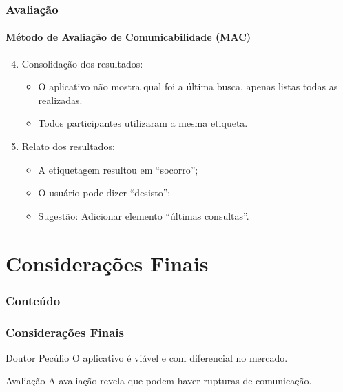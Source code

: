 \documentclass[14pt,beamer]{beamer}
\begin{document}
\begin{frame}
	\frametitle{Avaliação}
	\framesubtitle{Método de Avaliação de Comunicabilidade (MAC)}

	\begin{enumerate} \setcounter{enumi}{3}
        \item Consolidação dos resultados:
            \begin{itemize}
                \item O aplicativo não mostra qual foi a última busca,
                apenas listas todas as realizadas.
                \item Todos participantes utilizaram a mesma etiqueta.
            \end{itemize}
        \item Relato dos resultados:
            \begin{itemize}
                \item A etiquetagem resultou em ``socorro'';
                \item O usuário pode dizer ``desisto'';
                \item Sugestão: Adicionar elemento ``últimas consultas''.
            \end{itemize}
        \end{enumerate}
\end{frame}
\section{Considerações Finais}

\begin{frame}
	\frametitle{Conteúdo}
    \begin{multicols}{2}
        \small
    \end{multicols}
\end{frame}
\begin{frame}
	\frametitle{Considerações Finais}

	\begin{block}{Doutor Pecúlio}
	O aplicativo é viável e com diferencial no mercado.
	\end{block}
    
    \begin{block}{Avaliação}
	A avaliação revela que podem haver rupturas de comunicação.
	\end{block}
\end{frame}
\end{document}
